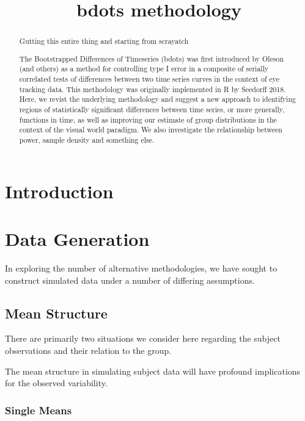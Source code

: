 \documentclass{article}
\title{bdots methodology}
\date{}
\begin{document}

\maketitle

%

\begin{abstract}
Gutting this entire thing and starting from scrayatch

The Bootstrapped Differences of Timeseries (bdots) was first introduced by Oleson (and others) as a method for controlling type I error in a composite of serially correlated tests of differences between two time series curves in the context of eye tracking data.  This methodology was originally implemented in R by Seedorff 2018. Here, we revist the underlying methodology and suggest a new approach to identifying regions of statistically significant differences between time series, or more generally, functions in time, as well as improving our estimate of group distributions in the context of the visual world paradigm. We also investigate the relationship between power, sample density and something else. 
\end{abstract}

\section{Introduction}

\section{Data Generation}

In exploring the number of alternative methodologies, we have sought to construct simulated data under a number of differing assumptions.

\subsection{Mean Structure}

There are primarily two situations we consider here regarding the subject observations and their relation to the group. 

The mean structure in simulating subject data will have profound implications for the observed variability. 

\subsubsection{Single Means}
\end{document}
